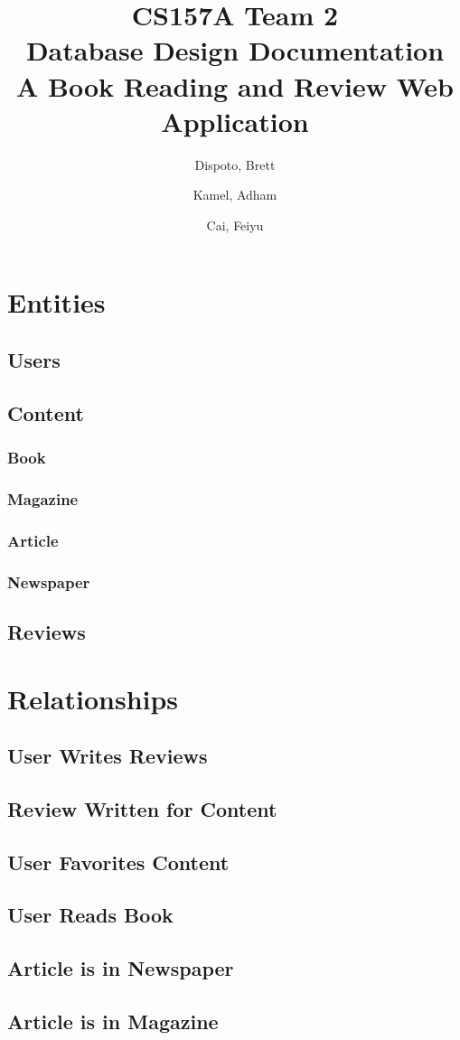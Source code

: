 \documentclass[letter, 12pt, titlepage]{article}
\author{
	Dispoto, Brett\\
        \and
        Kamel, Adham\\
        \and
        Cai, Feiyu\\
}
\title{CS157A Team 2 \\ Database Design Documentation \\
        \large A Book Reading and Review Web Application}
\begin{document}
  \maketitle
	\section{Entities}
		\subsection{Users}

		\subsection{Content}

			\subsubsection{Book}

			\subsubsection{Magazine}

			\subsubsection{Article}

			\subsubsection{Newspaper}
	
		\subsection{Reviews}

	\section{Relationships}
		\subsection{User Writes Reviews}


		\subsection{Review Written for Content}


		\subsection{User Favorites Content}

		\subsection{User Reads Book}

		\subsection{Article is in Newspaper}

		\subsection{Article is in Magazine}
\end{document}
